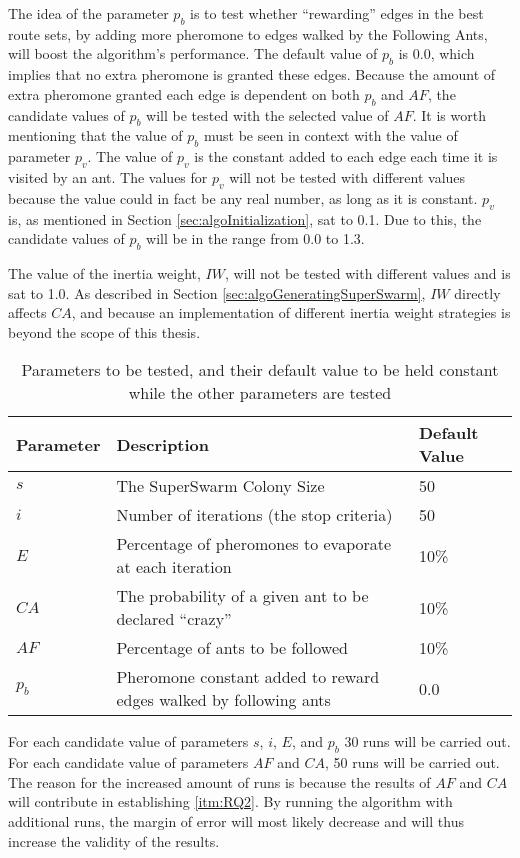 The idea of the parameter $p_b$ is to test whether ``rewarding'' edges in the best route sets, by adding more pheromone to edges walked by the Following Ants, will boost the algorithm's performance. The default value of $p_b$ is 0.0, which implies that no extra pheromone is granted these edges. Because the amount of extra pheromone granted each edge is dependent on both $p_b$ and $AF$, the candidate values of $p_b$ will be tested with the selected value of $AF$. It is worth mentioning that the value of $p_b$ must be seen in context with the value of parameter $p_v$. The value of $p_v$ is the constant added to each edge each time it is visited by an ant. The values for $p_v$ will not be tested with different values because the value could in fact be any real number, as long as it is constant. $p_v$ is, as mentioned in Section \vref{sec:algoInitialization}, sat to 0.1. Due to this, the candidate values of $p_b$ will be in the range from 0.0 to 1.3. 

The value of the inertia weight, $IW$, will not be tested with different values and is sat to 1.0. As described in Section \vref{sec:algoGeneratingSuperSwarm}, $IW$ directly affects $CA$, and because an implementation of different inertia weight strategies is beyond the scope of this thesis. 

\begin{table}[H]
    \centering
	\begin{tabular}{|l|m{7cm}|l|}
    	\hline
    	\textbf{Parameter} & \textbf{Description} & \textbf{Default Value}\\
    	\hline
    	$s$ & The SuperSwarm Colony Size & 50\\
        
    	$i$ & Number of iterations (the stop criteria) & 50\\
        
    	$E$ & Percentage of pheromones to evaporate at each iteration & 10\%\\
        
    	$CA$ & The probability of a given ant to be declared ``crazy'' & 10\%\\
        
    	$AF$ & Percentage of ants to be followed & 10\%\\
        
        $p_b$ & Pheromone constant added to reward edges walked by following ants & 0.0\\
   	    \hline
    \end{tabular}
    \caption {Parameters to be tested, and their default value to be held constant while the other parameters are tested}
    \label{table:parameters}
\end{table}
%
For each candidate value of parameters $s$, $i$, $E$, and $p_b$ 30 runs will be carried out. For each candidate value of parameters $AF$ and $CA$, 50 runs will be carried out. The reason for the increased amount of runs is because the results of $AF$ and $CA$ will contribute in establishing \vref{itm:RQ2}. By running the algorithm with additional runs, the margin of error will most likely decrease and will thus increase the validity of the results.


